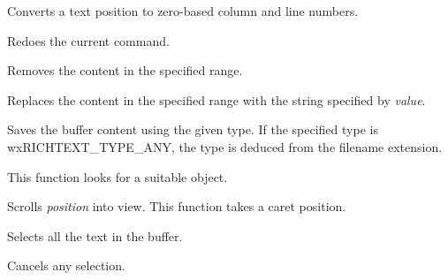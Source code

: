 Converts a text position to zero-based column and line numbers.

\label{wxrichtextctrlredo}


Redoes the current command.

\label{wxrichtextctrlremove}


Removes the content in the specified range.

\label{wxrichtextctrlreplace}


Replaces the content in the specified range with the string specified by {\it value}.

\label{wxrichtextctrlsavefile}


Saves the buffer content using the given type. If the specified type
is wxRICHTEXT\_TYPE\_ANY, the type is deduced from the filename extension.

This function looks for a suitable  object.

\label{wxrichtextctrlscrollintoview}


Scrolls {\it position} into view. This function takes a caret position.

\label{wxrichtextctrlselectall}


Selects all the text in the buffer.

\label{wxrichtextctrlselectnone}


Cancels any selection.

\label{wxrichtextctrlsetandshowdefaultstyle}

